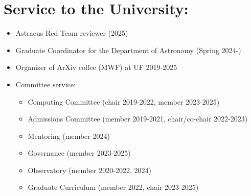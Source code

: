 \begin{minipage}{\textwidth}
\section*{Service to the University:}
\vspace{-10pt}
\begin{itemize}
    \item Astraeus Red Team reviewer (2025)
    \item Graduate Coordinator for the Department of Astronomy (Spring 2024-)
    \item Organizer of ArXiv coffee (MWF) at UF 2019-2025
    \item Committee service:
        \begin{itemize}
                \item Computing Committee (chair 2019-2022, member 2023-2025)
                \item Admissions Committee (member 2019-2021, chair/co-chair 2022-2023)
                \item Mentoring (member 2024)
                \item Governance (member 2023-2025)
                \item Observatory (member 2020-2022, 2024)
                \item Graduate Curriculum (member 2022, chair 2023-2025)
            \end{itemize}
\itemsep-3pt
\end{itemize}
\end{minipage}
\vspace{4mm}
